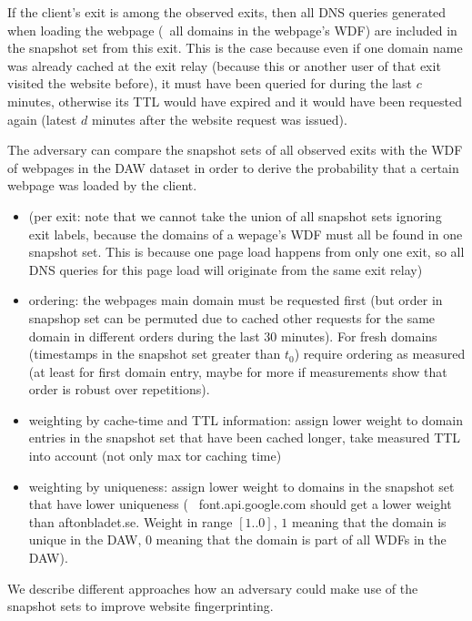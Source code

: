 If the client's exit is among the observed exits, then all DNS queries
generated when loading the webpage (\ie~all domains in the webpage's
WDF) are included in the snapshot set from this exit. This is the case
because even if one domain name was already cached at the exit relay
(because this or another user of that exit visited the website before),
it must have been queried for during the last $c$ minutes, otherwise its
TTL would have expired and it would have been requested again (latest
$d$ minutes after the website request was issued).

The adversary can compare the snapshot sets of all observed exits with
the WDF of webpages in the DAW dataset in order to derive the
probability that a certain webpage was loaded by the client.

\begin{itemize}
  \item (per exit: note that we cannot take the union of all snapshot
		  sets ignoring exit labels, because the domains of a wepage's
		  WDF must all be found in one snapshot set. This is because one
		  page load happens from only one exit, so all DNS queries for
		  this page load will originate from the same exit relay)
  \item ordering: the webpages main domain must be requested first (but
		  order in snapshop set can be permuted due to cached other
		  requests for the same domain in different orders during the
		  last 30 minutes). For fresh domains (timestamps in the
		  snapshot set greater than $t_0$) require ordering as measured
		  (at least for first domain entry, maybe for more if
		  measurements show that order is robust over repetitions).
  \item weighting by cache-time and TTL information: assign lower weight
		  to domain entries in the snapshot set that have been cached
		  longer, take measured TTL into account (not only max tor
		  caching time)
  \item weighting by uniqueness: assign lower weight to domains in the
		  snapshot set that have lower uniqueness (\eg~
		  font.api.google.com should get a lower weight than
		  aftonbladet.se. Weight in range $[1..0]$, $1$ meaning that the
		  domain is unique in the DAW, $0$ meaning that the domain is
		  part of all WDFs in the DAW).
\end{itemize}

We describe different approaches how an adversary could make use of the
snapshot sets to improve website fingerprinting.

